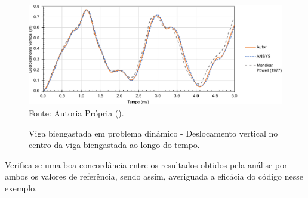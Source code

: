 \begin{figure}[h!]
    \centering
    \caption{Viga biengastada em problema dinâmico - Deslocamento vertical no centro da viga biengastada ao longo do tempo.}
    \includegraphics[width=\linewidth]{Figuras/vigas/res2.pdf}
    \\Fonte: Autoria Própria (\the\year).
    \label{fig:res-viga2}
\end{figure}

Verifica-se uma boa concordância entre os resultados obtidos pela análise por ambos os valores de referência, sendo assim, averiguada a eficácia do código nesse exemplo.